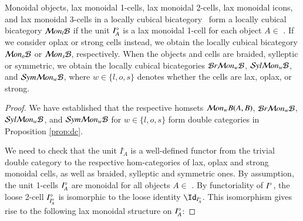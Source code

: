 \begin{thm}\label{thm:lcbc}
Monoidal objects, lax monoidal 1-cells, lax monoidal 2-cells, lax monoidal icons, and lax monoidal 3-cells in a locally cubical bicategory \fB\ form a locally cubical bicategory $\mathcal{M} on_l\mathcal{B}$ if the unit $I^{\circ}_A$ is a lax monoidal 1-cell for each object $A \in$ \fB. If we consider oplax or strong cells instead, we obtain the locally cubical bicategory $\mathcal{M} on_o\mathcal{B}$ or $\mathcal{M} on_s\mathcal{B}$, respectively. When the objects and cells are braided, sylleptic or symmetric,  we obtain the locally cubical bicategories $\mathcal{B} r \mathcal{M} on_w\mathcal{B}$, $\mathcal{S} yl \mathcal{M} on_w\mathcal{B}$, and $\mathcal{S} ym \mathcal{M} on_w\mathcal{B}$, where $w \in \{l,o,s\}$ denotes whether the cells are lax, oplax, or strong.
\end{thm}

\begin{proof}
We have established that the respective homsets $\mathcal{M} on_wB(A,B)$, $\mathcal{B} r \mathcal{M} on_w\mathcal{B}$, $\mathcal{S} yl \mathcal{M} on_w\mathcal{B}$, and $\mathcal{S} ym \mathcal{M} on_w\mathcal{B}$ for $w \in \{l,o,s\}$ form double categories in Proposition \ref{prop:dc}. 

We need to check that the unit $I^{\comp}_A$ is a well-defined functor from the trivial double category to the respective hom-categories of lax, oplax and strong monoidal cells, as well as braided, sylleptic and symmetric ones. 
By assumption, the unit 1-cells $I^{\circ}_A$ are monoidal for all objects $A \in$ \fB. By functoriality of $I^{\circ}$, the loose 2-cell $I^{\circ}_{I^{\circ}_A}$ is isomorphic to the loose identity $\looseid_{\compI_A}$. This isomorphism gives rise to the following lax monoidal structure on $I^{\circ}_A$: 


\end{proof}
